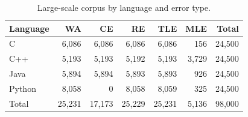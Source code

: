 \begin{table}[t]
\centering
\caption{Large-scale corpus by language and error type.}
\label{tab:language-error-matrix}
\begin{tabular}{lrrrrrr}
\toprule
Language & WA & CE & RE & TLE & MLE & Total \\
\midrule
C & 6,086 & 6,086 & 6,086 & 6,086 & 156 & 24,500 \\
C++ & 5,193 & 5,193 & 5,192 & 5,193 & 3,729 & 24,500 \\
Java & 5,894 & 5,894 & 5,893 & 5,893 & 926 & 24,500 \\
Python & 8,058 & 0 & 8,058 & 8,059 & 325 & 24,500 \\
Total & 25,231 & 17,173 & 25,229 & 25,231 & 5,136 & 98,000 \\
\bottomrule
\end{tabular}
\end{table}
